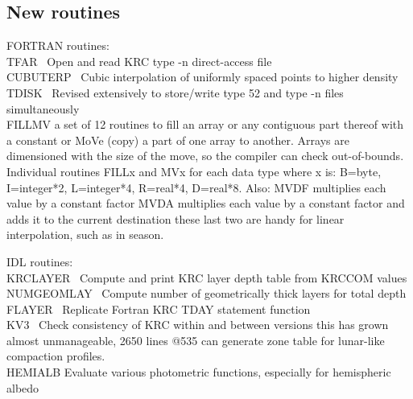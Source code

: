 \documentclass{article}
\begin{document}
\subsection{New routines}
FORTRAN routines:
\\ TFAR \ Open and read KRC type -n direct-access file
\\ CUBUTERP \ Cubic interpolation of uniformly spaced points to higher density
\\  TDISK \ Revised extensively to store/write type 52 and type -n files simultaneously 
\\ FILLMV a set of 12 routines to fill an array or any contiguous part thereof
with a constant or MoVe (copy) a part of one array to another. Arrays are
dimensioned with the size of the move, so the compiler can check
out-of-bounds. Individual routines FILLx and MVx for each data type where x is:
B=byte, I=integer*2, L=integer*4, R=real*4, D=real*8.  Also:
\qi MVDF multiplies each value by a constant factor
\qi MVDA multiplies each value by a constant factor and adds it to the current destination
\qii these last two are handy for linear interpolation, such as in season.

IDL routines:
\\ KRCLAYER \ Compute and print KRC layer depth table from KRCCOM values
\\  NUMGEOMLAY \ Compute number of geometrically thick layers for total depth
\\  FLAYER \ Replicate Fortran KRC TDAY statement function
\\  KV3 \ Check consistency of KRC within and between versions
\qii this has grown almost unmanageable, 2650 lines
\qiii @535 can generate zone table for lunar-like compaction profiles.
\\ HEMIALB Evaluate various photometric functions, especially for hemispheric albedo
\end{document}
